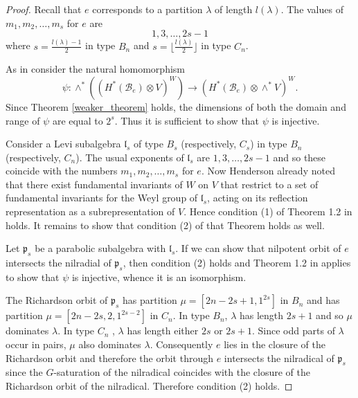 \documentclass[10pt]{amsart}
\newcommand{\levi}{\mathfrak l}
\newcommand{\flag}{{\mathcal B}}
\theoremstyle{plain}
\theoremstyle{definition}
\theoremstyle{remark}
\begin{document}
\begin{proof}
Recall that $e$ corresponds to a partition $\lambda$ of length $l(\lambda)$.  The values of 
$m_1, m_2, \dots, m_s$ for $e$  are 
$$1, 3, \dots, 2s-1$$
where $s = \frac{l(\lambda)-1}{2}$ in type $B_n$
and $s = \lfloor  \frac{l(\lambda)}{2}   \rfloor$ in type $C_n$.

As in \cite{henderson:exterior}
consider the natural homomorphism
$$\psi: \wedge^*(( H^*(\flag_e) \otimes V)^W)  \to (H^*(\flag_e) \otimes \wedge^* V)^W.$$
Since Theorem \ref{weaker_theorem} holds, the dimensions of both the domain and range of $\psi$ are equal to $2^s$. Thus it is sufficient to show that $\psi$ is injective.

Consider a Levi subalgebra $\levi_s$ of type $B_s$ (respectively, $C_s$) in type $B_n$ (respectively, $C_n$).    The usual exponents of $\levi_s$ are $1, 3, \dots, 2s-1$ and so these coincide with the numbers $m_1, m_2, \dots, m_s$ for $e$.  Now Henderson already noted that 
there exist fundamental invariants of $W$ on $V$ that restrict to a set of
fundamental invariants for the Weyl group of $\levi_s$, acting on its
reflection representation as a subrepresentation of $V$.
Hence condition (1) of Theorem 1.2 in 
 \cite{henderson:exterior} holds.  It remains to show that condition (2) of that Theorem holds as well.
 
Let $\mathfrak{p}_s$ be a parabolic subalgebra with $\levi_s$.  If we can show that nilpotent orbit of $e$ intersects the nilradial of $\mathfrak{p}_s$, then condition (2) holds and Theorem 1.2 in \cite{henderson:exterior} applies to show that 
$\psi$ is injective, whence it is an isomorphism. 

The Richardson orbit of $\mathfrak{p}_s$ has partition $\mu = [2n-2s+1, 1^{2s}]$ in $B_n$ 
and has partition $\mu = [2n-2s, 2, 1^{2s-2}]$ in $C_n$.  
In type $B_n$, $\lambda$ has length $2s+1$ and so $\mu$ dominates $\lambda$.  In type $C_n$ , $\lambda$ has length either $2s$ or $2s+1$.  Since odd parts of $\lambda$ occur in pairs, $\mu$ also dominates $\lambda$.  Consequently $e$ lies in the closure of the Richardson orbit and therefore the orbit through $e$ intersects the nilradical of $\mathfrak{p}_s$ since the $G$-saturation of the nilradical coincides with the closure of the Richardson orbit of the nilradical.  Therefore condition (2) holds.
\end{proof}
\end{document}
